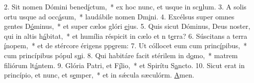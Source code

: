 2. Sit nomen Dómini bened\uline{í}ctum,~* ex hoc nunc, et usque in sc\uline{u}lum.
3. A solis ortu usque ad occ\uline{á}sum,~* laudábile nomen Dm\uline{i}ni.
4. Excélsus super omnes gentes D\uline{ó}minus,~* et super cælos glóri \uline{e}jus.
5. Quis sicut Dóminus, Deus noster, qui in altis h\uline{á}bitat,~* et humília réspicit in cælo et n t\uline{e}rra?
6. Súscitans a terra \uline{í}nopem,~* et de stércore érigens pp\uline{e}rem:
7. Ut cóllocet eum cum princ\uline{í}pibus,~* cum princípibus pópul s\uline{u}i.
8. Qui habitáre facit stérilem in d\uline{o}mo,~* matrem filiórum lt\uline{á}ntem.
9. Glória Patri, et F\uline{í}lio,~* et Spirítu S\uline{a}ncto.
10. Sicut erat in princípio, et nunc, et s\uline{e}mper,~* et in sǽcula sæculórm. \uline{A}men.
